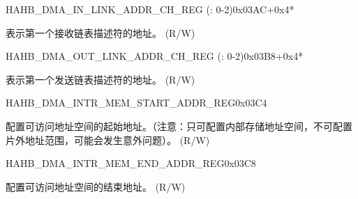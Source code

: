 \begin{register}{H}{AHB\_DMA\_IN\_LINK\_ADDR\_CH\_REG (: 0-2)}{0x03AC+0x4*}\label{regdesc:AHBDMAINLINKADDRCHNREG}
%
\regnewline%
\begin{regdesc}\begin{reglist}
\label{fielddesc:AHBDMAINLINKADDRCHN}\item [AHB\_DMA\_INLINK\_ADDR\_CH\regindex{n}] 表示第一个接收链表描述符的地址。 (R/W)
\end{reglist}\end{regdesc}
\end{register}


\begin{register}{H}{AHB\_DMA\_OUT\_LINK\_ADDR\_CH\_REG (: 0-2)}{0x03B8+0x4*}\label{regdesc:AHBDMAOUTLINKADDRCHNREG}
%
\regnewline%
\begin{regdesc}\begin{reglist}
\label{fielddesc:AHBDMAOUTLINKADDRCHN}\item [AHB\_DMA\_OUTLINK\_ADDR\_CH\regindex{n}] 表示第一个发送链表描述符的地址。 (R/W)
\end{reglist}\end{regdesc}
\end{register}


\begin{register}{H}{AHB\_DMA\_INTR\_MEM\_START\_ADDR\_REG}{0x03C4}\label{regdesc:AHBDMAINTRMEMSTARTADDRREG}
%
\regnewline%
\begin{regdesc}\begin{reglist}
\label{fielddesc:AHBDMAACCESSINTRMEMSTARTADDR}\item [AHB\_DMA\_ACCESS\_INTR\_MEM\_START\_ADDR] 配置可访问地址空间的起始地址。（注意：只可配置内部存储地址空间，不可配置片外地址范围，可能会发生意外问题）。 (R/W)
\end{reglist}\end{regdesc}
\end{register}


\begin{register}{H}{AHB\_DMA\_INTR\_MEM\_END\_ADDR\_REG}{0x03C8}\label{regdesc:AHBDMAINTRMEMENDADDRREG}
%
\regnewline%
\begin{regdesc}\begin{reglist}
\label{fielddesc:AHBDMAACCESSINTRMEMENDADDR}\item [AHB\_DMA\_ACCESS\_INTR\_MEM\_END\_ADDR] 配置可访问地址空间的结束地址。 (R/W)
\end{reglist}\end{regdesc}
\end{register}


